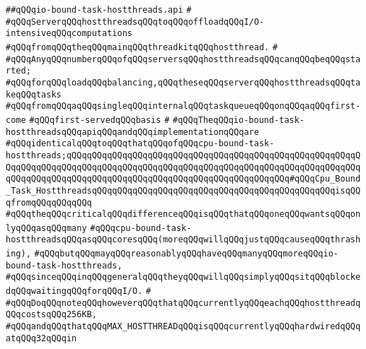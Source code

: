 \label{src/lib/std/src/hostthread/io-bound-task-hostthreads.api}
\verb|##qQQqio-bound-task-hostthreads.api|\newline
\verb|#|\newline
\verb|#qQQqServerqQQqhostthreadsqQQqtoqQQqoffloadqQQqI/O-intensiveqQQqcomputations|\newline
\verb|#qQQqfromqQQqtheqQQqmainqQQqthreadkitqQQqhostthread.|\newline
\verb|#|\newline
\verb|#qQQqAnyqQQqnumberqQQqofqQQqserversqQQqhostthreadsqQQqcanqQQqbeqQQqstarted;|\newline
\verb|#qQQqforqQQqloadqQQqbalancing,qQQqtheseqQQqserverqQQqhostthreadsqQQqtakeqQQqtasks|\newline
\verb|#qQQqfromqQQqaqQQqsingleqQQqinternalqQQqtaskqueueqQQqonqQQqaqQQqfirst-come|\newline
\verb|#qQQqfirst-servedqQQqbasis|\newline
\verb|#|\newline
\verb|#qQQqTheqQQqio-bound-task-hostthreadsqQQqapiqQQqandqQQqimplementationqQQqare|\newline
\verb|#qQQqidenticalqQQqtoqQQqthatqQQqofqQQqcpu-bound-task-hostthreads;qQQqqQQqqQQqqQQqqQQqqQQqqQQqqQQqqQQqqQQqqQQqqQQqqQQqqQQqqQQqqQQqqQQqqQQqqQQqqQQqqQQqqQQqqQQqqQQqqQQqqQQqqQQqqQQqqQQqqQQqqQQqqQQqqQQqqQQqqQQqqQQqqQQqqQQqqQQqqQQqqQQqqQQqqQQqqQQqqQQqqQQq#qQQqCpu_Bound_Task_HostthreadsqQQqqQQqqQQqqQQqqQQqqQQqqQQqqQQqqQQqqQQqqQQqqQQqisqQQqfromqQQqqQQqqQQq|\newline
\verb|#qQQqtheqQQqcriticalqQQqdifferenceqQQqisqQQqthatqQQqoneqQQqwantsqQQqonlyqQQqasqQQqmany|\newline
\verb|#qQQqcpu-bound-task-hostthreadsqQQqasqQQqcoresqQQq(moreqQQqwillqQQqjustqQQqcauseqQQqthrashing),|\newline
\verb|#qQQqbutqQQqmayqQQqreasonablyqQQqhaveqQQqmanyqQQqmoreqQQqio-bound-task-hostthreads,|\newline
\verb|#qQQqsinceqQQqinqQQqgeneralqQQqtheyqQQqwillqQQqsimplyqQQqsitqQQqblockedqQQqwaitingqQQqforqQQqI/O.|\newline
\verb|#|\newline
\verb|#qQQqDoqQQqnoteqQQqhoweverqQQqthatqQQqcurrentlyqQQqeachqQQqhostthreadqQQqcostsqQQq256KB,|\newline
\verb|#qQQqandqQQqthatqQQqMAX_HOSTTHREADqQQqisqQQqcurrentlyqQQqhardwiredqQQqatqQQq32qQQqin|\newline
